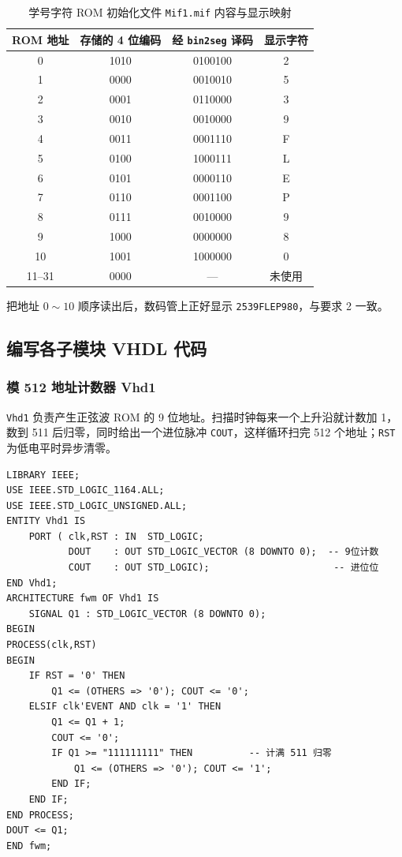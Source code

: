 \documentclass[12pt]{ctexart}
\begin{document}
\begin{table}[H]
    \centering
    \caption{学号字符 ROM 初始化文件 \texttt{Mif1.mif} 内容与显示映射}
    \label{tab:xuehaomif}
    \begin{tabular}{cccc}
        \toprule
        \textbf{ROM 地址} & \textbf{存储的 4 位编码} & \textbf{经 \texttt{bin2seg} 译码} & \textbf{显示字符} \\
        \midrule
        0  & 1010 & 0100100 & 2 \\
        1  & 0000 & 0010010 & 5 \\
        2  & 0001 & 0110000 & 3 \\
        3  & 0010 & 0010000 & 9 \\
        4  & 0011 & 0001110 & F \\
        5  & 0100 & 1000111 & L \\
        6  & 0101 & 0000110 & E \\
        7  & 0110 & 0001100 & P \\
        8  & 0111 & 0010000 & 9 \\
        9  & 1000 & 0000000 & 8 \\
        10 & 1001 & 1000000 & 0 \\
        11--31 & 0000 & --- & 未使用 \\
        \bottomrule
    \end{tabular}
\end{table}

把地址 $0\sim10$ 顺序读出后，数码管上正好显示 \texttt{2539FLEP980}，与要求 2 一致。

\subsection{编写各子模块 VHDL 代码}

\subsubsection{模 512 地址计数器 Vhd1}

\texttt{Vhd1} 负责产生正弦波 ROM 的 9 位地址。扫描时钟每来一个上升沿就计数加 1，数到 511 后归零，同时给出一个进位脉冲 \texttt{COUT}，这样循环扫完 512 个地址；\texttt{RST} 为低电平时异步清零。

\begin{verbatim}
LIBRARY IEEE;
USE IEEE.STD_LOGIC_1164.ALL;
USE IEEE.STD_LOGIC_UNSIGNED.ALL;
ENTITY Vhd1 IS
    PORT ( clk,RST : IN  STD_LOGIC;
           DOUT    : OUT STD_LOGIC_VECTOR (8 DOWNTO 0);  -- 9位计数
           COUT    : OUT STD_LOGIC);                      -- 进位位
END Vhd1;
ARCHITECTURE fwm OF Vhd1 IS
    SIGNAL Q1 : STD_LOGIC_VECTOR (8 DOWNTO 0);
BEGIN
PROCESS(clk,RST)
BEGIN
    IF RST = '0' THEN
        Q1 <= (OTHERS => '0'); COUT <= '0';
    ELSIF clk'EVENT AND clk = '1' THEN
        Q1 <= Q1 + 1;
        COUT <= '0';
        IF Q1 >= "111111111" THEN          -- 计满 511 归零
            Q1 <= (OTHERS => '0'); COUT <= '1';
        END IF;
    END IF;
END PROCESS;
DOUT <= Q1;
END fwm;
\end{verbatim}
\label{lst:vhd1}
\end{document}
